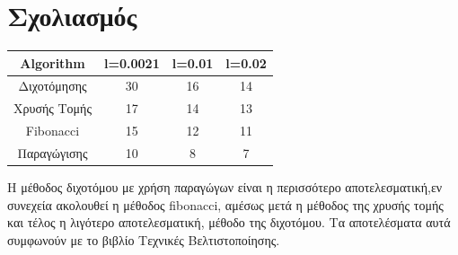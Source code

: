 \documentclass{article}
\begin{document}
 \section*{Σχολιασμός}


\begin{center}
 \begin{tabular}{||c c c c||} 
 \hline
 Algorithm & l=0.0021 & l=0.01 & l=0.02  \\ [0.9ex] 
 \hline\hline
 Διχοτόμησης & 30 & 16 & 14 \\ 
 \hline
 Χρυσής Τομής & 17 & 14 & 13 \\
 \hline
 Fibonacci & 15 & 12 & 11 \\
 \hline
 Παραγώγισης & 10 & 8 & 7 \\
 \hline
 
\end{tabular}
\end{center}
Η
μέθοδος διχοτόμου με χρήση παραγώγων είναι η περισσότερο αποτελεσματική,εν
συνεχεία ακολουθεί η μέθοδος fibonacci, αμέσως μετά η μέθοδος της χρυσής τομής
και τέλος η λιγότερο αποτελεσματική, μέθοδο της διχοτόμου. Τα αποτελέσματα
αυτά συμφωνούν με το βιβλίο Τεχνικές Βελτιστοποίησης.
\end{document}
